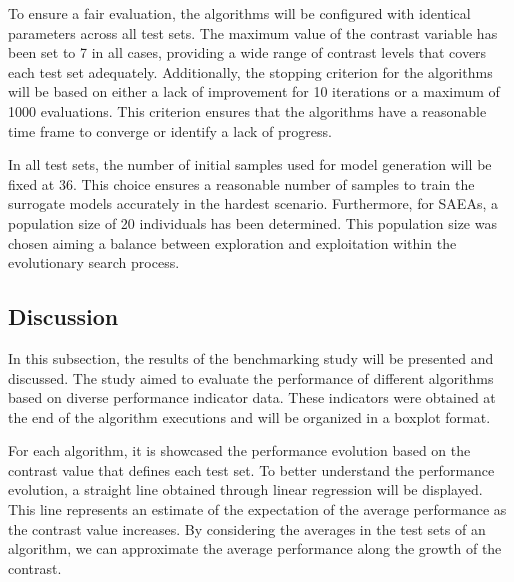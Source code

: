 			To ensure a fair evaluation, the algorithms will be configured with identical parameters across all test sets. The maximum value of the contrast variable has been set to 7 in all cases, providing a wide range of contrast levels that covers each test set adequately. Additionally, the stopping criterion for the algorithms will be based on either a lack of improvement for 10 iterations or a maximum of 1000 evaluations. This criterion ensures that the algorithms have a reasonable time frame to converge or identify a lack of progress.
			
			In all test sets, the number of initial samples used for model generation will be fixed at 36. This choice ensures a reasonable number of samples to train the surrogate models accurately in the hardest scenario. Furthermore, for SAEAs, a population size of 20 individuals has been determined. This population size was chosen aiming a balance between exploration and exploitation within the evolutionary search process.
		
		\subsection{Discussion}\label{chap:results:benchmark:discussion}
		
			
			In this subsection, the results of the benchmarking study will be presented and discussed. The study aimed to evaluate the performance of different algorithms based on diverse performance indicator data. These indicators were obtained at the end of the algorithm executions and will be organized in a boxplot format.
			
			For each algorithm, it is showcased the performance evolution based on the contrast value that defines each test set. To better understand the performance evolution, a straight line obtained through linear regression will be displayed. This line represents an estimate of the expectation of the average performance as the contrast value increases. By considering the averages in the test sets of an algorithm, we can approximate the average performance along the growth of the contrast.
			
